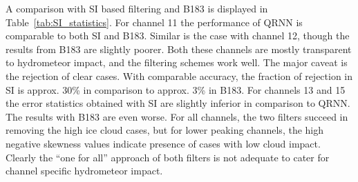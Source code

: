 \documentclass[amt, manuscript]{copernicus}
\begin{document}
A comparison with SI based filtering and B183 is displayed in  Table~\ref{tab:SI_statistics}. For channel 11 the performance of QRNN is comparable to both SI and B183. Similar is the case with channel 12, though the results from B183 are slightly poorer. Both these channels are mostly transparent to hydrometeor impact, and the filtering schemes work well. The major caveat is the rejection of clear cases. With comparable accuracy, the fraction of rejection in SI is approx. 30\% in comparison to approx. 3\% in B183. For channels 13 and 15 the error statistics obtained with SI are slightly inferior in comparison to QRNN. The results with B183 are even worse. For all channels, the two filters succeed in removing the high ice cloud cases, but for lower peaking channels, the high negative skewness values indicate presence of cases with low cloud impact. Clearly the ``one for all'' approach of both filters is not adequate to cater for channel specific hydrometeor impact.  
\end{document}
